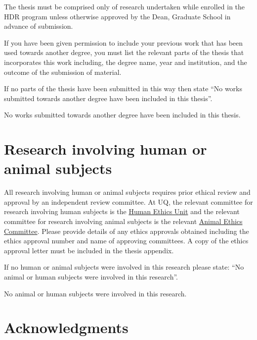 \begin{instructional}
The thesis must be comprised only of research undertaken while enrolled in the HDR program unless otherwise approved by the Dean, Graduate School in advance of submission.

If you have been given permission to include your previous work that has been used towards another degree, you must list the relevant parts of the thesis that incorporates this work including, the degree name, year and institution, and the outcome of the submission of material. 

If no parts of the thesis have been submitted in this way then state ``No works submitted towards another degree have been included in this thesis''.
\end{instructional}

No works submitted towards another degree have been included in this thesis.

\section*{Research involving human or animal subjects}

\begin{instructional}
	All research involving human or animal subjects requires prior ethical review and approval by an independent review committee. At UQ, the relevant committee for research involving human subjects is the \href{http://www.uq.edu.au/research/integrity-compliance/human-ethics}{Human Ethics Unit} and the relevant committee for research involving animal subjects is the relevant \href{http://www.uq.edu.au/research/integrity-compliance/animal-welfare}{Animal Ethics Committee}.  Please provide details of any ethics approvals obtained including the ethics approval number and name of approving committees.  A copy of the ethics approval letter must be included in the thesis appendix.

	If no human or animal subjects were involved in this research please state: ``No animal or human subjects were involved in this research''.
\end{instructional}

No animal or human subjects were involved in this research.

\clearpage

\section*{Acknowledgments}

